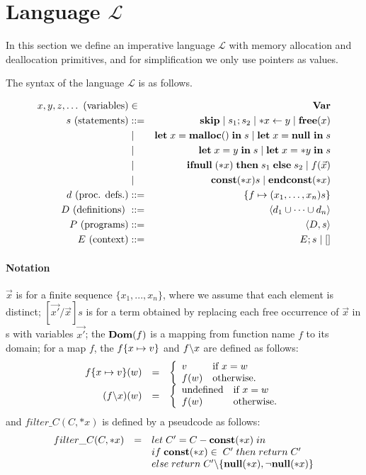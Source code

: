 \section{Language \(\mathcal{L}\)}\label{sec:language}
In this section we define an imperative language \(\mathcal{L}\) with
memory allocation and deallocation primitives, and for simplification
we only use pointers as values.
 
The syntax of the language \(\mathcal{L}\) is as follows.

\begin{eqnarray*}
  x,y,z,\dots \mbox{ (variables)} &\in& \mathbf{Var}\\
  s \mbox{ (statements)} & ::= &  \mathbf{skip} \mid s_{1};s_{2} \mid *x \leftarrow y \mid \mathbf{free}(x) \\
  & \mid & \mathbf{let}\; x = \mathbf{malloc()}\; \mathbf{in}\; s \mid \mathbf{let}\; x = \mathbf{null}\ \mathbf{in}\; s  \\
  & \mid & \mathbf{let}\; x = y \; \mathbf{in}\; s \mid   \mathbf{let}\; x = *y \; \mathbf{in}\; s \\
  & \mid & \mathbf{ifnull}\;(*x) \; \mathbf{then}\; s_{1}\; \mathbf{else}\; s_{2} \mid f(\vec{x})\\
  & \mid & \mathbf{const}(*x) s \mid \mathbf{endconst}(*x)  \\
  d \mbox{ (proc. defs.)} & ::= & \{f \mapsto (x_1,\dots,x_n)s\}\\
  D \mbox{ (definitions) } &::=& \langle d_1 \cup \dots \cup d_n \rangle\\
  P \mbox{ (programs)} &::=& \langle D, s \rangle\\
  E \mbox{ (context)} &::=& E;s \mid [ ] 
\end{eqnarray*}

\paragraph{Notation} \(\vec{x}\) is for a finite sequence \(\{x_1,...,x_n\}\),
where we assume that each element is distinct; \([\vec{x'}/\vec{x}]s\)
is for a term obtained by replacing each free occurrence of
\(\vec{x}\) in s with variables \(\vec{x'}\); the \(\mathbf{Dom}(f)\) is a
mapping from function name \(f\) to its domain; for a map \(f\), the
\(f \{x \mapsto v\}\) and \( f \backslash x\) are defined as follows:
\[
\begin{array}{rcl}
f \{x \mapsto v\} (w) &=&
\left\{
\begin{array}{ll}
v & \mbox{if \(x = w\)}\\
f(w) & \mbox{otherwise.}
\end{array}
\right.\\
(f \backslash x)(w) &=&
\left\{
\begin{array}{ll}
\mbox{undefined} & \mbox{if \(x = w\)}\\
f(w) & \mbox{otherwise.}
\end{array}
\right.
\end{array}
\]
and \(filter\_C(C, *x)\) is defined by a pseudcode as follows:
\[
\begin{array}{lcl}
  filter\_C(C, *x) &=& let \; C' = C - \mathbf{const}(*x) \; in \\
  & & if \; \mathbf{const}(*x) \in \; C'\; then \; return \; C'\\
  & & else \; return \; C'\backslash\{{\bf null}(*x),\neg{\bf null}(*x) \}
\end{array}
\]

